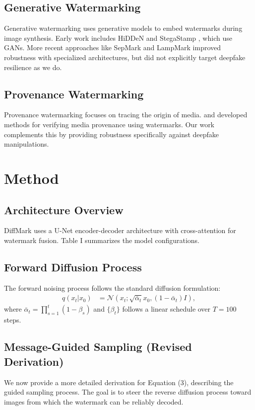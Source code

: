 \documentclass{article}
\begin{document}
\subsection{Generative Watermarking}
Generative watermarking uses generative models to embed watermarks during image synthesis. Early work includes HiDDeN \cite{zhu2018hidden} and StegaStamp \cite{tancik2020stegastamp}, which use GANs. More recent approaches like SepMark \cite{wu2023sepmark} and LampMark \cite{wang2024lampmark} improved robustness with specialized architectures, but did not explicitly target deepfake resilience as we do.

\subsection{Provenance Watermarking}
Provenance watermarking focuses on tracing the origin of media. \cite{zhao2024provenance} and \cite{li2025digital} developed methods for verifying media provenance using watermarks. Our work complements this by providing robustness specifically against deepfake manipulations.

\section{Method}

\subsection{Architecture Overview}
DiffMark uses a U-Net encoder-decoder architecture with cross-attention for watermark fusion. Table I summarizes the model configurations.

\subsection{Forward Diffusion Process}
The forward noising process follows the standard diffusion formulation:
\begin{align}
q(x_t|x_0) &= \mathcal{N}\left(x_t; \sqrt{\bar{\alpha}_t} x_0, (1-\bar{\alpha}_t) I\right),
\end{align}
where $\bar{\alpha}_t = \prod_{s=1}^t (1-\beta_s)$ and $\{\beta_t\}$ follows a linear schedule over $T=100$ steps.

\subsection{Message-Guided Sampling (Revised Derivation)}
We now provide a more detailed derivation for Equation (3), describing the guided sampling process. The goal is to steer the reverse diffusion process toward images from which the watermark can be reliably decoded.
\end{document}
